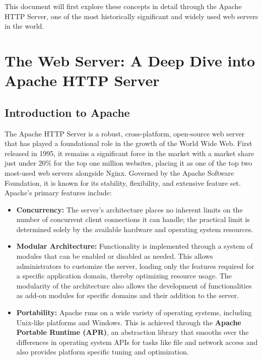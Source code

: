 \documentclass{scrbook}
\begin{document}
	This document will first explore these concepts in detail through the Apache HTTP Server,
	one of the most historically significant and widely used web servers in the world.
	
	\chapter{The Web Server: A Deep Dive into Apache HTTP Server}
	
	\section{Introduction to Apache}
	
	The Apache HTTP Server is a robust, cross-platform, open-source web server that has played
	a foundational role in the growth of the World Wide Web. First released in 1995, it remains a significant force in the market with a market share just under 20\% for the top one million websites, placing	it as one of the top two most-used web servers alongside Nginx. Governed by the Apache
	Software Foundation, it is known for its stability, flexibility, and extensive feature set.\\
	
	Apache's primary features include:
	
	\begin{itemize}
		\item \textbf{Concurrency:} The server's architecture places no inherent limits on the
		number of concurrent client connections it can handle; the practical limit is
		determined solely by the available hardware and operating system resources.
		
		\item \textbf{Modular Architecture:} Functionality is implemented through a system of
		modules that can be enabled or disabled as needed. This allows administrators to
		customize the server, loading only the features required for a specific application
		domain, thereby optimizing resource usage. The modularity of the architecture also allows the development of functionalities as add-on modules for specific domains and their addition to the server.
		
		\item \textbf{Portability:} Apache runs on a wide variety of operating systems,
		including Unix-like platforms and Windows. This is achieved through the
		\textbf{Apache Portable Runtime (APR)}, an abstraction library that smooths over
		the differences in operating system APIs for tasks like file and network access and also provides platform specific tuning and optimization.
	\end{itemize}
	
\end{document}
